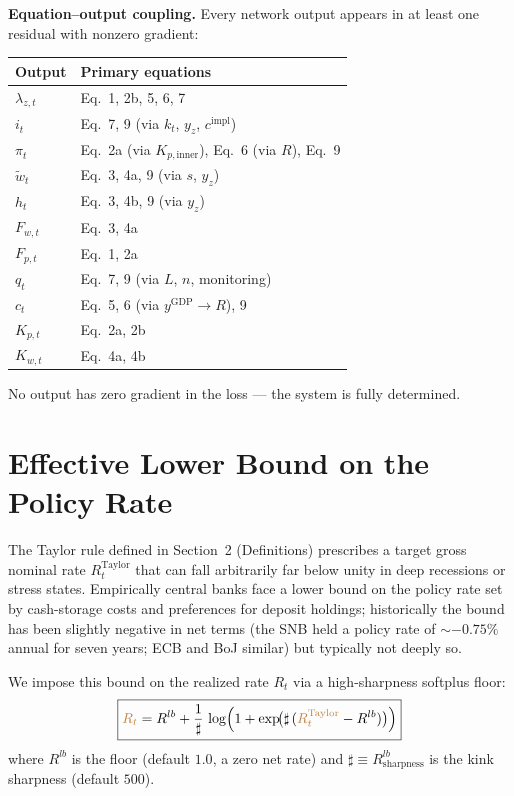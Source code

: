 \documentclass[11pt]{article}
\begin{document}
\medskip\noindent\textbf{Equation--output coupling.}\;
Every network output appears in at least one residual with nonzero gradient:
\begin{center}
\small
\begin{tabular}{ll}
\toprule
Output & Primary equations \\
\midrule
$\lambda_{z,t}$ & Eq.~1, 2b, 5, 6, 7 \\
$i_t$ & Eq.~7, 9 (via $k_t$, $y_z$, $c^{\text{impl}}$) \\
$\pi_t$ & Eq.~2a (via $K_{p,\text{inner}}$), Eq.~6 (via $R$), Eq.~9 \\
$\tilde{w}_t$ & Eq.~3, 4a, 9 (via $s$, $y_z$) \\
$h_t$ & Eq.~3, 4b, 9 (via $y_z$) \\
$F_{w,t}$ & Eq.~3, 4a \\
$F_{p,t}$ & Eq.~1, 2a \\
$q_t$ & Eq.~7, 9 (via $L$, $n$, monitoring) \\
$c_t$ & Eq.~5, 6 (via $y^{\text{GDP}} \to R$), 9 \\
$K_{p,t}$ & Eq.~2a, 2b \\
$K_{w,t}$ & Eq.~4a, 4b \\
\bottomrule
\end{tabular}
\end{center}
No output has zero gradient in the loss --- the system is fully determined.


\section{Effective Lower Bound on the Policy Rate}
\label{sec:elb}

The Taylor rule defined in Section~2 (Definitions) prescribes a target
gross nominal rate $R^{\text{Taylor}}_t$ that can fall arbitrarily far
below unity in deep recessions or stress states. Empirically central
banks face a lower bound on the policy rate set by cash-storage costs
and preferences for deposit holdings; historically the bound has been
slightly negative in net terms (the SNB held a policy rate of
${\sim}-0.75\%$ annual for seven years; ECB and BoJ similar) but
typically not deeply so.

We impose this bound on the realized rate $R_t$ via a high-sharpness
softplus floor:
\begin{equation*}
  \boxed{\textcolor{brown}{R_t}
    = R^{lb}
      + \frac{1}{\sharp}\,\log\!\left(
          1 + \exp\!\bigl(\sharp\,(\textcolor{brown}{R^{\text{Taylor}}_t} - R^{lb})\bigr)
        \right)}
\end{equation*}
where $R^{lb}$ is the floor (default $1.0$, a zero net rate) and
$\sharp \equiv R^{lb}_{\text{sharpness}}$ is the kink sharpness
(default $500$).
\end{document}
